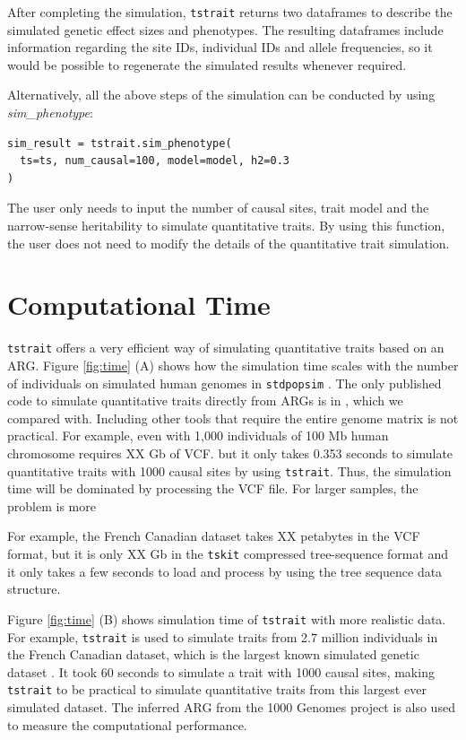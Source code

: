 \documentclass[unnumsec,webpdf,modern,large,namedate]{oup-authoring-template}%
\theoremstyle{thmstyleone}%
\theoremstyle{thmstyletwo}%
\theoremstyle{thmstylethree}%
\begin{document}
After completing the simulation, \texttt{tstrait} returns two dataframes to describe the simulated genetic effect sizes and phenotypes. The resulting dataframes include information regarding the site IDs, individual IDs and allele frequencies, so it would be possible to regenerate the simulated results whenever required.

Alternatively, all the above steps of the simulation can be conducted by using \emph{sim\_phenotype}:
\begin{verbatim}
sim_result = tstrait.sim_phenotype(
  ts=ts, num_causal=100, model=model, h2=0.3
)
\end{verbatim}
The user only needs to input the number of causal sites, trait model and the narrow-sense heritability to simulate quantitative traits. By using this function, the user does not need to modify the details of the quantitative trait simulation.

\section{Computational Time}

\texttt{tstrait} offers a very efficient way of simulating quantitative traits based on an ARG. Figure \ref{fig:time} (A) shows how the simulation time scales with the number of individuals on simulated human genomes in \texttt{stdpopsim} \citep{adrion2020}. The only published code to simulate quantitative traits directly from ARGs is in \cite{martin2017}, which we compared with. Including other tools that require the entire genome matrix is not practical. For example, even with 1,000 individuals of 100 Mb human chromosome requires XX Gb of VCF. but it only takes 0.353 seconds to simulate quantitative traits with 1000 causal sites by using \texttt{tstrait}. Thus, the simulation time will be dominated by processing the VCF file. For larger samples, the problem is more 

For example, the French Canadian dataset takes XX petabytes in the VCF format, but it is only XX Gb in the \texttt{tskit} compressed tree-sequence format and it only takes a few seconds to load and process by using the tree sequence data structure.

Figure \ref{fig:time} (B) shows simulation time of \texttt{tstrait} with more realistic data. For example, \texttt{tstrait} is used to simulate traits from 2.7 million individuals in the French Canadian dataset, which is the largest known simulated genetic dataset \citep{anderson2023}. It took 60 seconds to simulate a trait with 1000 causal sites, making \texttt{tstrait} to be practical to simulate quantitative traits from this largest ever simulated dataset. The inferred ARG from the 1000 Genomes project \citep{kelleher2019} is also used to measure the computational performance.
\end{document}
